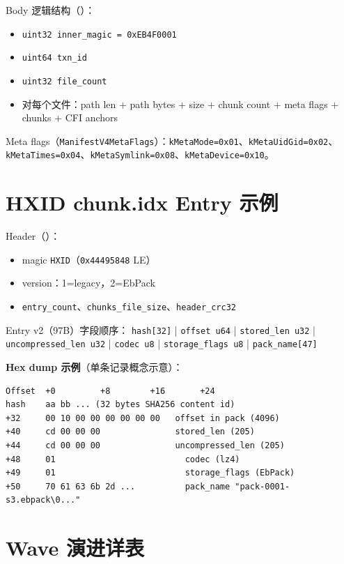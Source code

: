 Body 逻辑结构（）：
\begin{itemize}[nosep]
  \item \texttt{uint32 inner\_magic = 0xEB4F0001}
  \item \texttt{uint64 txn\_id}
  \item \texttt{uint32 file\_count}
  \item 对每个文件：path len + path bytes + size + chunk count + meta flags + chunks + CFI anchors
\end{itemize}

Meta flags（\texttt{ManifestV4MetaFlags}）：\texttt{kMetaMode=0x01}、\texttt{kMetaUidGid=0x02}、\texttt{kMetaTimes=0x04}、\texttt{kMetaSymlink=0x08}、\texttt{kMetaDevice=0x10}。

\section{HXID chunk.idx Entry 示例}

Header（）：
\begin{itemize}[nosep]
  \item magic \texttt{HXID}（\texttt{0x44495848} LE）
  \item version：1=legacy，2=EbPack
  \item \texttt{entry\_count}、\texttt{chunks\_file\_size}、\texttt{header\_crc32}
\end{itemize}

Entry v2（97B）字段顺序：
\texttt{hash[32]} | \texttt{offset u64} | \texttt{stored\_len u32} | \texttt{uncompressed\_len u32} | \texttt{codec u8} | \texttt{storage\_flags u8} | \texttt{pack\_name[47]}

\textbf{Hex  dump 示例}（单条记录概念示意）：

\begin{verbatim}
Offset  +0         +8        +16       +24
hash    aa bb ... (32 bytes SHA256 content id)
+32     00 10 00 00 00 00 00 00   offset in pack (4096)
+40     cd 00 00 00               stored_len (205)
+44     cd 00 00 00               uncompressed_len (205)
+48     01                          codec (lz4)
+49     01                          storage_flags (EbPack)
+50     70 61 63 6b 2d ...          pack_name "pack-0001-s3.ebpack\0..."
\end{verbatim}

\section{Wave 演进详表}

